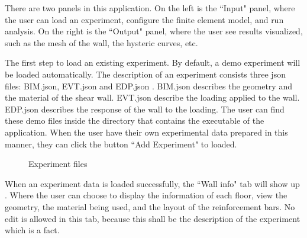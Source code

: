 There are two panels in this application.
On the left is the ``Input" panel, where the user can load an experiment, configure the finite element model, and run analysis.
On the right is the ``Output" panel, where the user see results visualized, such as the mesh of the wall, the hysteric curves, etc.


The first step to load an existing experiment. By default, a demo experiment will be loaded automatically. 
The description of an experiment consists three json files: BIM.json, EVT.json and EDP.json . 
BIM.json describes the geometry and the material of the shear wall.
EVT.json describe the loading applied to the wall. EDP.json describes the response of the wall to the loading. 
The user can find these demo files inside the directory that contains the executable of the application. 
When the user have their own experimental data prepared in this manner, they can click the button ``Add Experiment" to loaded.


\begin{figure}[!htbp]
  \caption{Experiment files}
  \label{fig:demos}
\end{figure}

When an experiment data is loaded successfully, the ``Wall info" tab will show up .
Where the user can choose to display the information of each floor, view the geometry, the material being used, and the layout of the reinforcement bars.
No edit is allowed in this tab, because this shall be the description of the experiment which is a fact.

